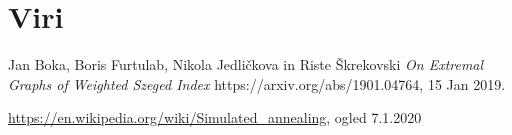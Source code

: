 \documentclass[12pt, a4paper]{article}
\begin{document}
\section[Viri]{Viri}

\begin{thebibliography}{9}
Jan Boka, Boris Furtulab, Nikola Jedličkova in Riste Škrekovski
\textit{On Extremal Graphs of Weighted Szeged Index} 
https://arxiv.org/abs/1901.04764, 15 Jan 2019.

\item \emph{} \url{https://en.wikipedia.org/wiki/Simulated_annealing}, ogled 7.1.2020

\end{thebibliography}
\end{document}
